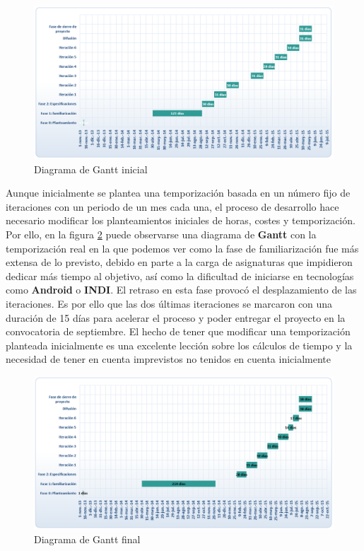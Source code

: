 \begin{figure}[!ht]
  \begin{center}
  \includegraphics[width=1\textwidth]{../images/gantt_ideal.png}
  \caption{Diagrama de Gantt inicial}
  \label{fig:diag_gantt_inicial}
  \end{center}
\end{figure}

\bigskip
Aunque inicialmente se plantea una temporización basada en un número fijo de iteraciones con un periodo de un mes cada una, el proceso de desarrollo hace necesario modificar los planteamientos iniciales de horas, costes y temporización. Por ello, en la figura \ref{fig:diag_gantt_final} puede observarse una diagrama de \textbf{Gantt} con la temporización real en la que podemos ver como la fase de familiarización fue más extensa de lo previsto, debido en parte a la carga de asignaturas que impidieron dedicar más tiempo al objetivo, así como la dificultad de iniciarse en tecnologías como \textbf{Android} o \textbf{INDI}. El retraso en esta fase provocó el desplazamiento de las iteraciones. Es por ello que las dos últimas iteraciones se marcaron con una duración de 15 días para acelerar el proceso y poder entregar el proyecto en la convocatoria de septiembre. El hecho de tener que modificar una temporización planteada inicialmente es una excelente lección sobre los cálculos de tiempo y la necesidad de tener en cuenta imprevistos no tenidos en cuenta inicialmente 

\begin{figure}[!ht]
  \begin{center}
  \includegraphics[width=1\textwidth]{../images/gantt_real.png}
  \caption{Diagrama de Gantt final}
  \label{fig:diag_gantt_final}
  \end{center}
\end{figure}

